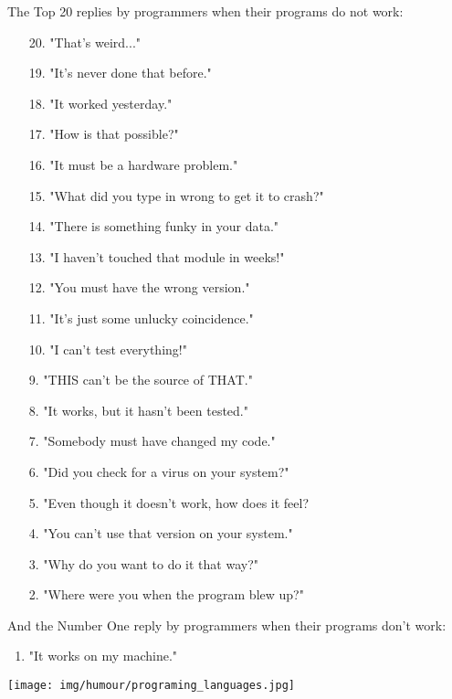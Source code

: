 The Top 20 replies by programmers when their programs do not work:
	\begin{enumerate}[nolistsep]
		\item[20.] "That's weird..."
		\item[19.] "It's never done that before."
		\item[18.] "It worked yesterday."
		\item[17.] "How is that possible?"
		\item[16.] "It must be a hardware problem."
		\item[15.] "What did you type in wrong to get it to crash?"
		\item[14.] "There is something funky in your data."
		\item[13.] "I haven't touched that module in weeks!"
		\item[12.] "You must have the wrong version."
		\item[11.] "It's just some unlucky coincidence."
		\item[10.] "I can't test everything!"
		\item[9.] "THIS can't be the source of THAT."
		\item[8.] "It works, but it hasn't been tested."
		\item[7.] "Somebody must have changed my code."
		\item[6.] "Did you check for a virus on your system?"
		\item[5.] "Even though it doesn't work, how does it feel?
		\item[4.] "You can't use that version on your system."
		\item[3.] "Why do you want to do it that way?"
		\item[2.] "Where were you when the program blew up?"
	\end{enumerate}

	And the Number One reply by programmers when their programs don't work:
	\begin{enumerate}
		\item "It works on my machine."		
	\end{enumerate}


	\begin{center}\underline{\hspace{5 cm}}\end{center}	
	
	\begin{center}
	\texttt{[image: img/humour/programing\_languages.jpg]}
	\end{center}
	
